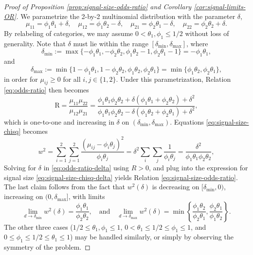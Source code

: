 \begin{proof}[Proof of Proposition \ref{prop:signal-size-odds-ratio} and Corollary \ref{cor:signal-limits-OR}]
We parametrize the 2-by-2 multinomial distribution with the parameter $\delta$, 
$$
\mu_{11} = \phi_1\theta_1+\delta,\quad \mu_{12} = \phi_1\theta_2-\delta,\quad 
\mu_{21} = \phi_2\theta_1-\delta,\quad \mu_{22} = \phi_2\theta_2+\delta.
$$ 
By relabeling of categories, we may assume $0<\theta_1,\phi_1\le1/2$ without loss of generality.
Note that $\delta$ must lie within the range $[\delta_\mathrm{min}, \delta_\mathrm{max}]$, where
$$
\delta_\mathrm{min} := \max\{-\phi_1\theta_1, -\phi_2\theta_2, \phi_1\theta_2-1, \phi_2\theta_1-1\} 
= -\phi_1\theta_1,
$$
and
$$
\delta_\mathrm{max} := \min\{1-\phi_1\theta_1, 1-\phi_2\theta_2, \phi_1\theta_2, \phi_2\theta_1\}
= \min\{\phi_1\theta_2, \phi_2\theta_1\},
$$
in order for $\mu_{ij}\ge0$ for all $i,j\in \{1,2\}$.
Under this parametrization, Relation \eqref{eq:odds-ratio} then becomes
\begin{equation} \label{eq:odds-ratio-delta}
    \text{R} = \frac{\mu_{11}\mu_{22}}{\mu_{12}\mu_{21}}
    = \frac{\phi_1\theta_1\phi_2\theta_2 + \delta(\phi_1\theta_1+\phi_2\theta_2)+\delta^2}{\phi_1\theta_1\phi_2\theta_2 - \delta(\phi_1\theta_2+\phi_2\theta_1)+\delta^2},
\end{equation}
which is one-to-one and increasing in $\delta$ on $(\delta_\mathrm{min}, \delta_\mathrm{max})$.
Equations \eqref{eq:signal-size-chisq} becomes
\begin{equation} \label{eq:signal-size-chisq-delta}
w^2 = \sum_{i=1}^2 \sum_{j=1}^2 \frac{(\mu_{ij} - \phi_i\theta_j)^2}{\phi_i\theta_j}
= \delta^2\sum_i\sum_j \frac{1}{\phi_i\theta_j}
= \frac{\delta^2}{\phi_1\theta_1\phi_2\theta_2},
\end{equation}
Solving for $\delta$ in \eqref{eq:odds-ratio-delta} using $R>0$, and plug into the expression for signal size \eqref{eq:signal-size-chisq-delta} yields Relation \eqref{eq:signal-size-odds-ratio}.
The last claim follows from the fact that $w^2(\delta)$ is decreasing on $[\delta_\mathrm{min},0)$, increasing on $(0,\delta_\mathrm{max}]$, with limits
$$
\lim_{d\to \delta_\mathrm{min}} w^2(\delta) = \frac{\phi_1\theta_1}{\phi_2\theta_2},
\quad
\text{and}
\quad
\lim_{d\to \delta_\mathrm{max}} w^2(\delta) = \min\left\{\frac{\phi_1\theta_2}{\phi_2\theta_1}, \frac{\phi_2\theta_1}{\phi_1\theta_2}\right\}.
$$
The other three cases ($1/2\le\theta_1,\phi_1\le1$, $0<\theta_1\le1/2\le\phi_1\le1$, and $0\le\phi_1\le1/2\le\theta_1\le1$) may be handled similarly, or simply by observing the symmetry of the problem.
\end{proof}

